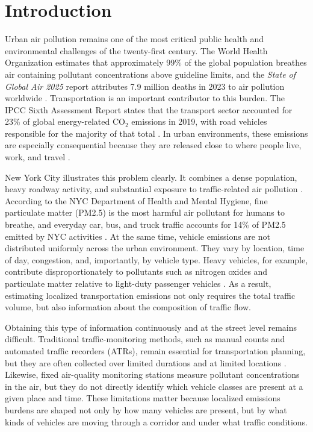 \section{Introduction}

Urban air pollution remains one of the most critical public health and environmental challenges of the twenty-first century.
The World Health Organization estimates that approximately 99\% of the global population
breathes air containing pollutant concentrations above guideline limits, and the
\textit{State of Global Air 2025} report attributes 7.9 million deaths in 2023 to air pollution
worldwide \cite{world_health_organization_air_nodate,health_effects_institute_state_2025}.
Transportation is an important contributor to this burden. The IPCC Sixth Assessment Report
states that the transport sector accounted for 23\% of global energy-related
$\mathrm{CO_2}$ emissions in 2019, with road vehicles responsible for the majority of that total
\cite{ipcc_climate_2022,creutzig_transport_2015}. In urban environments, these emissions are
especially consequential because they are released close to where people live, work, and travel
\cite{uherek_transport_2010}.

New York City illustrates this problem clearly. It combines a dense population, heavy roadway
activity, and substantial exposure to traffic-related air pollution
\cite{nyc_department_of_city_planning_population_2024,
nyc_department_of_health_and_mental_hygiene_traffic_nodate}.
According to the NYC Department of Health and Mental Hygiene, fine particulate matter 
(PM2.5) is the most harmful air pollutant for humans to breathe, and everyday car, bus, 
and truck traffic accounts for 14\% of PM2.5 emitted by NYC activities
\cite{nyc_department_of_health_and_mental_hygiene_traffic_nodate}. At the same time,
vehicle emissions are not distributed uniformly across the urban environment. They vary by
location, time of day, congestion, and, importantly, by vehicle type. Heavy vehicles, for example,
contribute disproportionately to pollutants such as nitrogen oxides and particulate matter relative
to light-duty passenger vehicles \cite{wang_high-resolution_2025}. As a result, estimating
localized transportation emissions not only requires the total traffic volume, but also 
information about the composition of traffic flow.

Obtaining this type of information continuously and at the street level remains difficult.
Traditional traffic-monitoring methods, such as manual counts and automated traffic recorders
(ATRs), remain essential for transportation planning, but they are often collected over limited
durations and at limited locations \cite{FHWA_traffic_2010,
NYC_open_data_atr}. Likewise, fixed air-quality monitoring stations measure
pollutant concentrations in the air, but they do not directly identify which vehicle classes are present
at a given place and time. These limitations matter because localized emissions burdens are shaped
not only by how many vehicles are present, but by what kinds of vehicles are moving through a
corridor and under what traffic conditions.

